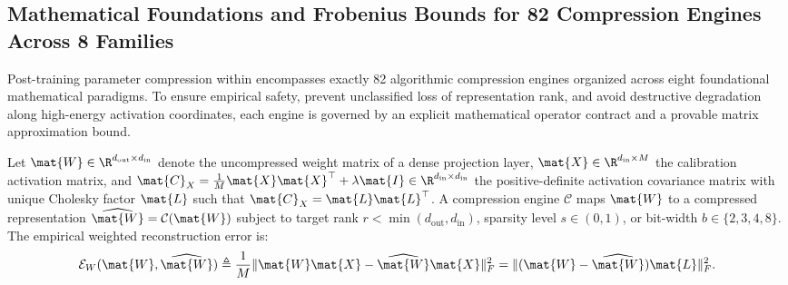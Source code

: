 \subsection{Mathematical Foundations and Frobenius Bounds for 82 Compression Engines Across 8 Families}
\label{sec:math_82_compressors}

Post-training parameter compression within \neuralops{} encompasses exactly 82 algorithmic compression engines organized across eight foundational mathematical paradigms. To ensure empirical safety, prevent unclassified loss of representation rank, and avoid destructive degradation along high-energy activation coordinates, each engine is governed by an explicit mathematical operator contract and a provable matrix approximation bound.

Let $\mat{W} \in \R^{d_{\text{out}} \times d_{\text{in}}}$ denote the uncompressed weight matrix of a dense projection layer, $\mat{X} \in \R^{d_{\text{in}} \times M}$ the calibration activation matrix, and $\mat{C}_X = \frac{1}{M}\mat{X}\mat{X}^\top + \lambda \mat{I} \in \R^{d_{\text{in}} \times d_{\text{in}}}$ the positive-definite activation covariance matrix with unique Cholesky factor $\mat{L}$ such that $\mat{C}_X = \mat{L}\mat{L}^\top$. A compression engine $\mathcal{C}$ maps $\mat{W}$ to a compressed representation $\widehat{\mat{W}} = \mathcal{C}(\mat{W})$ subject to target rank $r < \min(d_{\text{out}}, d_{\text{in}})$, sparsity level $s \in (0, 1)$, or bit-width $b \in \{2, 3, 4, 8\}$. The empirical weighted reconstruction error is:
\begin{equation}
\mathcal{E}_W(\mat{W}, \widehat{\mat{W}}) \triangleq \frac{1}{M} \|\mat{W}\mat{X} - \widehat{\mat{W}}\mat{X}\|_F^2 = \|(\mat{W} - \widehat{\mat{W}})\mat{L}\|_F^2.
\label{eq:comp_frob_whitened_obj}
\end{equation}

